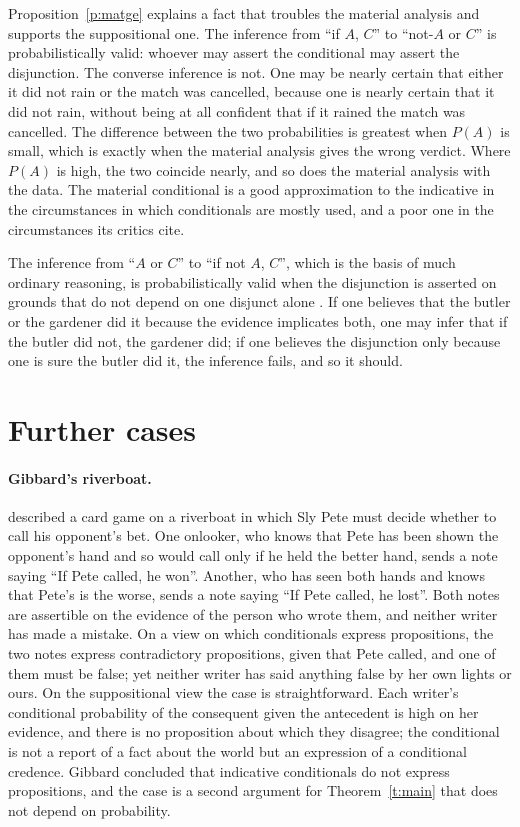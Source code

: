 \documentclass{situationist-preprint}
\begin{document}
Proposition~\ref{p:matge} explains a fact that troubles the material analysis and supports the suppositional one. The inference from \enquote{if $A$, $C$} to \enquote{not-$A$ or $C$} is probabilistically valid: whoever may assert the conditional may assert the disjunction. The converse inference is not. One may be nearly certain that either it did not rain or the match was cancelled, because one is nearly certain that it did not rain, without being at all confident that if it rained the match was cancelled. The difference between the two probabilities is greatest when $P(A)$ is small, which is exactly when the material analysis gives the wrong verdict. Where $P(A)$ is high, the two coincide nearly, and so does the material analysis with the data. The material conditional is a good approximation to the indicative in the circumstances in which conditionals are mostly used, and a poor one in the circumstances its critics cite.

The inference from \enquote{$A$ or $C$} to \enquote{if not $A$, $C$}, which is the basis of much ordinary reasoning, is probabilistically valid when the disjunction is asserted on grounds that do not depend on one disjunct alone \citep{Edgington1995}. If one believes that the butler or the gardener did it because the evidence implicates both, one may infer that if the butler did not, the gardener did; if one believes the disjunction only because one is sure the butler did it, the inference fails, and so it should.

\section{Further cases}\label{s:cases}

\paragraph{Gibbard's riverboat.} \citet{Gibbard1981} described a card game on a riverboat in which Sly Pete must decide whether to call his opponent's bet. One onlooker, who knows that Pete has been shown the opponent's hand and so would call only if he held the better hand, sends a note saying \enquote{If Pete called, he won}. Another, who has seen both hands and knows that Pete's is the worse, sends a note saying \enquote{If Pete called, he lost}. Both notes are assertible on the evidence of the person who wrote them, and neither writer has made a mistake. On a view on which conditionals express propositions, the two notes express contradictory propositions, given that Pete called, and one of them must be false; yet neither writer has said anything false by her own lights or ours. On the suppositional view the case is straightforward. Each writer's conditional probability of the consequent given the antecedent is high on her evidence, and there is no proposition about which they disagree; the conditional is not a report of a fact about the world but an expression of a conditional credence. Gibbard concluded that indicative conditionals do not express propositions, and the case is a second argument for Theorem~\ref{t:main} that does not depend on probability.
\end{document}
